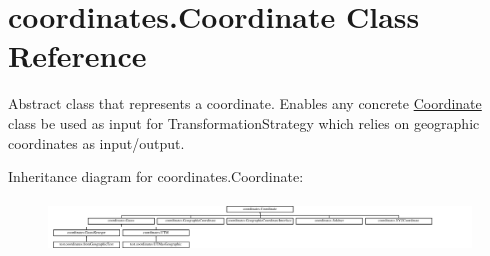 \hypertarget{classcoordinates_1_1_coordinate}{}\section{coordinates.\+Coordinate Class Reference}
\label{classcoordinates_1_1_coordinate}


Abstract class that represents a coordinate. Enables any concrete \hyperlink{classcoordinates_1_1_coordinate}{Coordinate} class be used as input for Transformation\+Strategy which relies on geographic coordinates as input/output.  


Inheritance diagram for coordinates.\+Coordinate\+:\begin{figure}[H]
\begin{center}
\leavevmode
\includegraphics[height=1.393035cm]{classcoordinates_1_1_coordinate}
\end{center}
\end{figure}
